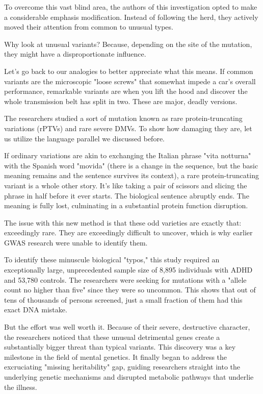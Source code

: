 To overcome this vast blind area, the authors of this investigation opted to make a considerable emphasis modification.  Instead of following the herd, they actively moved their attention from common to unusual types.  

Why look at unusual variants?  Because, depending on the site of the mutation, they might have a disproportionate influence.  

Let's go back to our analogies to better appreciate what this means.  If common variants are the microscopic "loose screws" that somewhat impede a car's overall performance, remarkable variants are when you lift the hood and discover the whole transmission belt has split in two.  These are major, deadly versions.  

The researchers studied a sort of mutation known as rare protein-truncating variations (rPTVs) and rare severe DMVs.  To show how damaging they are, let us utilize the language parallel we discussed before.  

If ordinary variations are akin to exchanging the Italian phrase "vita notturna" with the Spanish word "movida" (there is a change in the sequence, but the basic meaning remains and the sentence survives its context), a rare protein-truncating variant is a whole other story. 
It's like taking a pair of scissors and slicing the phrase in half before it ever starts.  The biological sentence abruptly ends.  The meaning is fully lost, culminating in a substantial protein function disruption.  

The issue with this new method is that these odd varieties are exactly that: exceedingly rare.  They are exceedingly difficult to uncover, which is why earlier GWAS research were unable to identify them.  

To identify these minuscule biological "typos," this study required an exceptionally large, unprecedented sample size of 8,895 individuals with ADHD and 53,780 controls.  The researchers were seeking for mutations with a "allele count no higher than five" since they were so uncommon. 
This shows that out of tens of thousands of persons screened, just a small fraction of them had this exact DNA mistake.  

But the effort was well worth it.  Because of their severe, destructive character, the researchers noticed that these unusual detrimental genes create a substantially bigger threat than typical variants.  This discovery was a key milestone in the field of mental genetics. 
It finally began to address the excruciating "missing heritability" gap, guiding researchers straight into the underlying genetic mechanisms and disrupted metabolic pathways that underlie the illness.  

